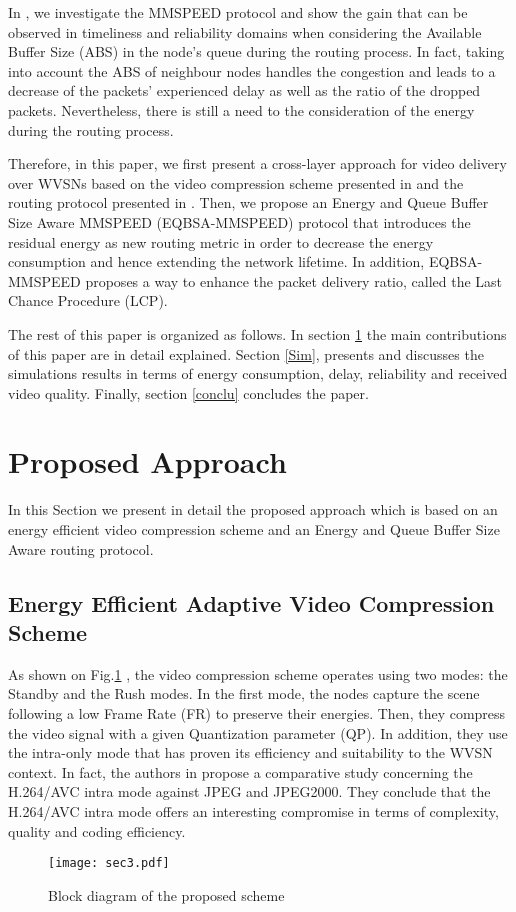 \documentclass[conference,a4paper]{IEEEtran}
\begin{document}
In \cite{our}, we investigate the MMSPEED protocol and show the gain that can be observed in timeliness and reliability domains when considering the Available Buffer Size (ABS) in the node's queue during the routing process. In fact, taking into account the ABS of neighbour nodes handles the congestion and leads to a decrease of the packets' experienced delay as well as the ratio of the dropped packets. Nevertheless, there is still a need to the consideration of the energy during the routing process.

Therefore, in this paper, we first present a cross-layer approach for video delivery over WVSNs based on the video compression scheme presented in \cite{fdili2013energy} and the routing protocol presented in \cite{our}. Then, we propose an Energy and Queue Buffer Size Aware MMSPEED (EQBSA-MMSPEED) protocol that introduces the residual energy as new routing metric in order to decrease the energy consumption and hence extending the network lifetime. In addition, EQBSA-MMSPEED proposes a way to enhance the packet delivery ratio, called the Last Chance Procedure (LCP).

The rest of this paper is organized as follows. In section \ref{app} the main contributions of this paper are in detail explained. Section \ref{Sim}, presents and discusses the simulations results in terms of energy consumption, delay, reliability and received video quality. Finally, section \ref{conclu} concludes the paper.




\section{Proposed Approach}
\label{app}
In this Section we present in detail the proposed approach which is based on an energy efficient video compression scheme and an Energy and Queue Buffer Size Aware routing protocol.
\subsection{Energy Efficient Adaptive Video Compression Scheme}
\label{videocomp}
 As shown on Fig.\ref{sec3} , the video compression scheme operates using two modes: the Standby and the Rush modes. In the first mode, the nodes capture the scene following a low Frame Rate (FR) to preserve their energies. Then, they compress the video signal with a given Quantization parameter (QP). In addition, they use the intra-only mode that has proven its efficiency and suitability to the WVSN context. In fact, the authors in \cite{JpegJ2K} propose a comparative study concerning the H.264/AVC intra mode against JPEG and JPEG2000. They conclude that the H.264/AVC intra mode offers an interesting compromise in terms of complexity, quality and coding efficiency. 
 \begin{figure}[htb]
\texttt{[image: sec3.pdf]}
\caption{Block diagram of the proposed scheme}
\label{sec3}
\end{figure}
\end{document}
